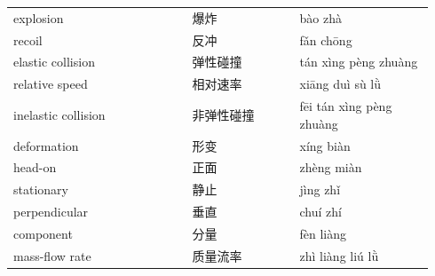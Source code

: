 \documentclass[11pt]{article}
\begin{document}
\begin{longtable}{@{}p{0.40\linewidth}p{0.24\linewidth}p{0.30\linewidth}@{}}
explosion & 爆炸 & bào zhà \\
recoil & 反冲 & fǎn chōng \\
elastic collision & 弹性碰撞 & tán xìng pèng zhuàng \\
relative speed & 相对速率 & xiāng duì sù lǜ \\
inelastic collision & 非弹性碰撞 & fēi tán xìng pèng zhuàng \\
deformation & 形变 & xíng biàn \\
head-on & 正面 & zhèng miàn \\
stationary & 静止 & jìng zhǐ \\
perpendicular & 垂直 & chuí zhí \\
component & 分量 & fèn liàng \\
mass-flow rate & 质量流率 & zhì liàng liú lǜ \\
\end{longtable}
\end{document}
